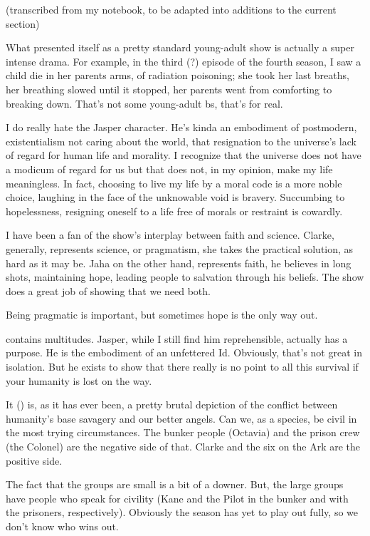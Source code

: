 \documentclass[../butidigress.tex]{subfiles}
\begin{document}
\begin{somenotes}{}
    \item (transcribed from my notebook, to be adapted into additions to the current section)
    \item What presented itself as a pretty standard young-adult show is actually a super intense drama. For example, in the third (?) episode of the fourth season, I saw a child die in her parents arms, of radiation poisoning; she took her last breaths, her breathing slowed until it stopped, her parents went from comforting to breaking down. That's not some young-adult bs, that's for real. \par I do really hate the Jasper character. He's kinda an embodiment of postmodern, existentialism not caring about the world, that resignation to the universe's lack of regard for human life and morality. I recognize that the universe does not have a modicum of regard for us but that does not, in my opinion, make my life meaningless. In fact, choosing to live my life by a moral code is a more noble choice, laughing in the face of the unknowable void is bravery. Succumbing to hopelessness, resigning oneself to a life free of morals or restraint is cowardly.\par I have been a fan of the show's interplay between faith and science. Clarke, generally, represents science, or pragmatism, she takes the practical solution, as hard as it may be. Jaha on the other hand, represents faith, he believes in long shots, maintaining hope, leading people to salvation through his beliefs. The show does a great job of showing that we need both.\par Being pragmatic is important, but sometimes hope is the only way out.
    \item {} contains multitudes. Jasper, while I still find him reprehensible, actually has a purpose. He is the embodiment of an unfettered Id. Obviously, that's not great in isolation. But he exists to show that there really is no point to all this survival if your humanity is lost on the way.
    \item It () is, as it has ever been, a pretty brutal depiction of the conflict between humanity's base savagery and our better angels. Can we, as a species, be civil in the most trying circumstances. The bunker people (Octavia) and the prison crew (the Colonel) are the negative side of that. Clarke and the six on the Ark are the positive side.\par The fact that the  groups are small is a bit of a downer. But, the large groups have people who speak for civility (Kane and the Pilot in the bunker and with the prisoners, respectively). Obviously the season has yet to play out fully, so we don't know who wins out.
\end{somenotes}
\end{document}
